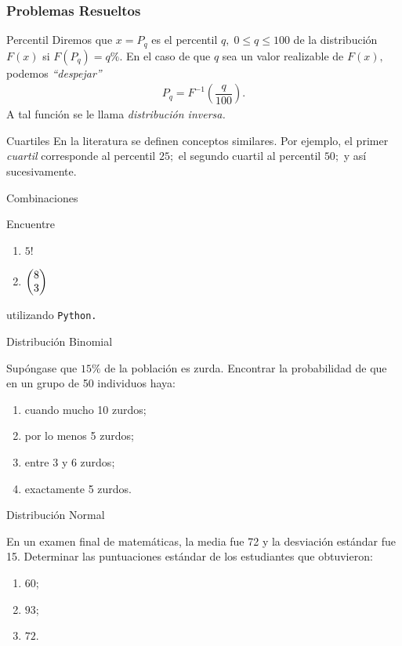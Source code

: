 \subsubsection{Problemas Resueltos}
{Percentil}
 Diremos que $x=P_{q}$ es el percentil $q, \; 0\leq q \leq 100$ de la distribución $F(x)$ si $F(P_{q})=q\%.$  En el caso de que $q$ sea un valor realizable de $F(x),$ podemos \emph{``despejar''}
 \begin{align}
  P_{q}=F^{-1}\left( \dfrac{q}{100} \right).
 \end{align}
 A tal función se le llama \emph{distribución inversa.}


{Cuartiles}
 En la literatura se definen conceptos similares. Por ejemplo, el primer \emph{cuartil} corresponde al percentil $25;$ el segundo cuartil al percentil $50;$ y así sucesivamente.

{Combinaciones}
 \begin{ejemplo}
  \label{exmp:2.10.7}
  Encuentre
  \begin{enumerate}
   \item $5!$
   \item $\begin{pmatrix} 8 \\ 3\end{pmatrix}$
  \end{enumerate}
  utilizando \texttt{Python.}
 \end{ejemplo}







{Distribución Binomial}
 \begin{ejemplo}
  \label{exmp:2.10.8}
  Supóngase que $15\%$ de la población es zurda. Encontrar la probabilidad de que en un grupo de 50 individuos haya:
  \begin{enumerate}
   \item cuando mucho 10 zurdos;
   \item por lo menos 5 zurdos;
   \item entre 3 y 6 zurdos;
   \item exactamente 5 zurdos.
  \end{enumerate}

 \end{ejemplo}






{Distribución Normal}
 \begin{ejemplo}
  \label{exmp:2.10.9}
  En un examen final de matemáticas, la media fue 72 y la desviación estándar fue 15. Determinar las puntuaciones estándar de los estudiantes que obtuvieron:
  \begin{enumerate}
   \item $60$;
   \item $93$;
   \item $72$.
  \end{enumerate}

 \end{ejemplo}



